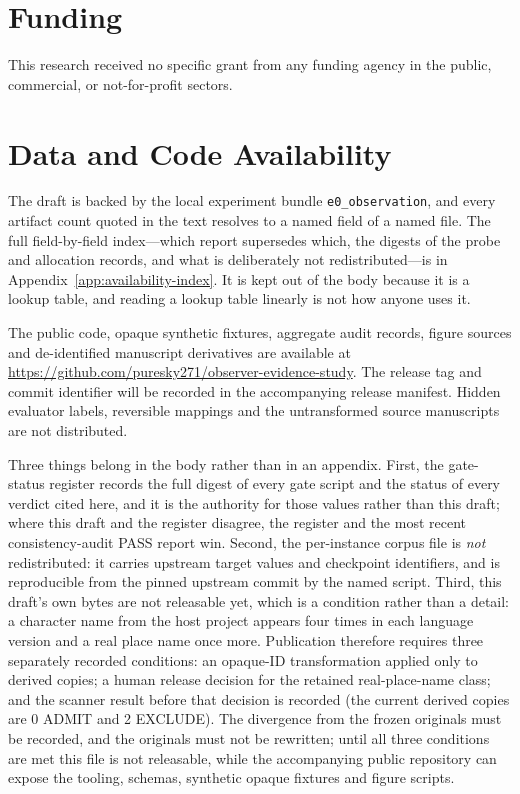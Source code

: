 \documentclass[11pt]{article}
\begin{document}
\section*{Funding}
This research received no specific grant from any funding agency in the public, commercial, or not-for-profit sectors.

\section*{Data and Code Availability}
The draft is backed by the local experiment bundle \texttt{e0\_observation}, and every artifact count quoted in the text resolves to a named field of a named file. The full field-by-field index---which report supersedes which, the digests of the probe and allocation records, and what is deliberately not redistributed---is in Appendix~\ref{app:availability-index}. It is kept out of the body because it is a lookup table, and reading a lookup table linearly is not how anyone uses it.

The public code, opaque synthetic fixtures, aggregate audit records, figure sources and de-identified manuscript derivatives are available at \url{https://github.com/puresky271/observer-evidence-study}. The release tag and commit identifier will be recorded in the accompanying release manifest. Hidden evaluator labels, reversible mappings and the untransformed source manuscripts are not distributed.

Three things belong in the body rather than in an appendix. First, the gate-status register  records the full digest of every gate script and the status of every verdict cited here, and it is the authority for those values rather than this draft; where this draft and the register disagree, the register and the most recent consistency-audit PASS report win. Second, the per-instance corpus file is \emph{not} redistributed: it carries upstream target values and checkpoint identifiers, and is reproducible from the pinned upstream commit by the named script. Third, this draft's own bytes are not releasable yet, which is a condition rather than a detail: a character name from the host project appears four times in each language version and a real place name once more. Publication therefore requires three separately recorded conditions: an opaque-ID transformation applied only to derived copies; a human release decision for the retained real-place-name class; and the scanner result before that decision is recorded (the current derived copies are 0 ADMIT and 2 EXCLUDE). The divergence from the frozen originals must be recorded, and the originals must not be rewritten; until all three conditions are met this file is not releasable, while the accompanying public repository can expose the tooling, schemas, synthetic opaque fixtures and figure scripts.
\end{document}
